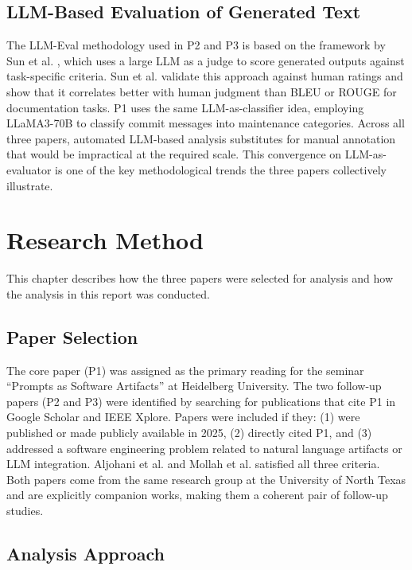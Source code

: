 \documentclass[
    pdftex,
    final,
    11pt,
    a4paper,
    parskip=false,
    oneside,
    footheight=0mm,
    footinclude=false,
    toc=bibliography
]{scrbook}
\begin{document}
\section{LLM-Based Evaluation of Generated Text}

The LLM-Eval methodology used in P2 and P3 is based on the framework by Sun et al. \cite{Sun2024}, which uses a large LLM as a judge to score generated outputs against task-specific criteria. Sun et al. validate this approach against human ratings and show that it correlates better with human judgment than BLEU \cite{Papineni2002} or ROUGE for documentation tasks. P1 uses the same LLM-as-classifier idea, employing LLaMA3-70B to classify commit messages into maintenance categories. Across all three papers, automated LLM-based analysis substitutes for manual annotation that would be impractical at the required scale. This convergence on LLM-as-evaluator is one of the key methodological trends the three papers collectively illustrate.


\chapter{Research Method}
\label{ch:method}

This chapter describes how the three papers were selected for analysis and how the analysis in this report was conducted.

\section{Paper Selection}

The core paper (P1) was assigned as the primary reading for the seminar ``Prompts as Software Artifacts'' at Heidelberg University. The two follow-up papers (P2 and P3) were identified by searching for publications that cite P1 in Google Scholar and IEEE Xplore. Papers were included if they: (1) were published or made publicly available in 2025, (2) directly cited P1, and (3) addressed a software engineering problem related to natural language artifacts or LLM integration. Aljohani et al. \cite{Aljohani2025} and Mollah et al. \cite{Mollah2025} satisfied all three criteria. Both papers come from the same research group at the University of North Texas and are explicitly companion works, making them a coherent pair of follow-up studies.

\section{Analysis Approach}
\end{document}
